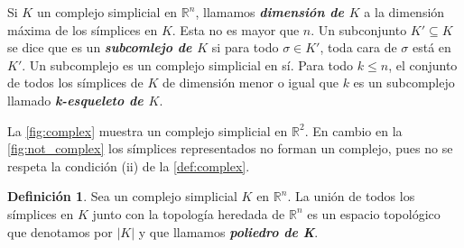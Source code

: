 \documentclass[10pt]{report}
\newcommand{\R}{\mathbb{R}}
\newcommand{\enfatiza}[1]{\textbf{\textit{#1}}}
\theoremstyle{definition}
\newtheorem{defin}{Definición}[section]
\begin{document}
Si $K$ un complejo simplicial en $\R ^n$, llamamos \enfatiza{dimensión de $K$} a la dimensión máxima de los símplices en $K$. Esta no es mayor que $n$.
Un subconjunto $K'\subseteq K$ se dice que es un \enfatiza{subcomlejo de $K$} si para todo $\sigma \in K'$, toda cara de $\sigma$ está en $K'$. Un subcomplejo es un complejo simplicial en sí.
Para todo $k\leq n$, el conjunto de todos los símplices de $K$ de dimensión menor o igual que $k$ es un subcomplejo llamado \enfatiza{k-esqueleto de $K$}.

La \autoref{fig:complex} muestra un complejo simplicial en $\R^2$. En cambio en la \autoref{fig:not_complex} los símplices representados no forman un complejo, pues no se respeta la condición (ii) de la \autoref{def:complex}.




\begin{defin}%
Sea un complejo simplicial $K$ en $\R ^n$. La unión de todos los símplices en $K$ junto con la topología heredada de $\R ^n$ es un espacio topológico que denotamos por $|K|$ y que llamamos \enfatiza{poliedro de K}.
\end{defin}
\end{document}
